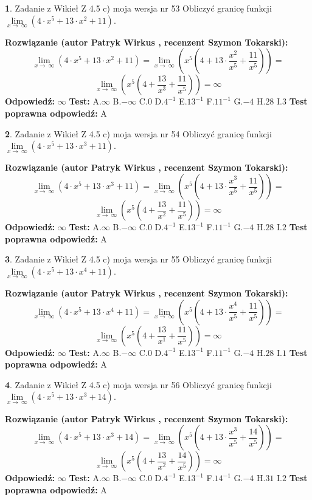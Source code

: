 \documentclass[12pt, a4paper]{article}
\theoremstyle{definition} %
\newtheorem{zad}{}
\newcommand{\zadStart}[1]{\begin{zad}#1\newline}
\newcommand{\zadStop}{\end{zad}}
\newcommand{\rozwStart}[2]{\noindent \textbf{Rozwiązanie (autor #1 , recenzent #2): }\newline}
\newcommand{\rozwStop}{\newline}
\newcommand{\odpStart}{\noindent \textbf{Odpowiedź:}\newline}
\newcommand{\odpStop}{\newline}
\newcommand{\testStart}{\noindent \textbf{Test:}\newline}
\newcommand{\testStop}{\newline}
\newcommand{\kluczStart}{\noindent \textbf{Test poprawna odpowiedź:}\newline}
\newcommand{\kluczStop}{\newline}
\begin{document}
\zadStart{Zadanie z Wikieł Z 4.5 c) moja wersja nr 53}
Obliczyć granicę funkcji  $\lim\limits_{x\to\ \infty}(4 \cdot x^{5}+13 \cdot x^{2}+11)$.
\zadStop
\rozwStart{Patryk Wirkus}{Szymon Tokarski}
$$\lim\limits_{x\to\ \infty}(4 \cdot x^{5}+13 \cdot x^{2}+11) = \lim\limits_{x\to\ \infty}(x^{5}(4 +13 \cdot \frac{x^{2}}{x^{5}}+\frac{11}{x^{5}})) =$$ $$\lim\limits_{x\to\ \infty}(x^{5}(4 +\frac{13}{x^{3}}+\frac{11}{x^{5}})) =\infty$$
\rozwStop
\odpStart
$\infty$
\odpStop
\testStart
A.$\infty$ B.$-\infty$ C.$0$ D.$4^{-1}$ E.$13^{-1}$
F.$11^{-1}$ G.$-4$
H.$28$
I.$3$
\testStop
\kluczStart
A
\kluczStop



\zadStart{Zadanie z Wikieł Z 4.5 c) moja wersja nr 54}
Obliczyć granicę funkcji  $\lim\limits_{x\to\ \infty}(4 \cdot x^{5}+13 \cdot x^{3}+11)$.
\zadStop
\rozwStart{Patryk Wirkus}{Szymon Tokarski}
$$\lim\limits_{x\to\ \infty}(4 \cdot x^{5}+13 \cdot x^{3}+11) = \lim\limits_{x\to\ \infty}(x^{5}(4 +13 \cdot \frac{x^{3}}{x^{5}}+\frac{11}{x^{5}})) =$$ $$\lim\limits_{x\to\ \infty}(x^{5}(4 +\frac{13}{x^{2}}+\frac{11}{x^{5}})) =\infty$$
\rozwStop
\odpStart
$\infty$
\odpStop
\testStart
A.$\infty$ B.$-\infty$ C.$0$ D.$4^{-1}$ E.$13^{-1}$
F.$11^{-1}$ G.$-4$
H.$28$
I.$2$
\testStop
\kluczStart
A
\kluczStop



\zadStart{Zadanie z Wikieł Z 4.5 c) moja wersja nr 55}
Obliczyć granicę funkcji  $\lim\limits_{x\to\ \infty}(4 \cdot x^{5}+13 \cdot x^{4}+11)$.
\zadStop
\rozwStart{Patryk Wirkus}{Szymon Tokarski}
$$\lim\limits_{x\to\ \infty}(4 \cdot x^{5}+13 \cdot x^{4}+11) = \lim\limits_{x\to\ \infty}(x^{5}(4 +13 \cdot \frac{x^{4}}{x^{5}}+\frac{11}{x^{5}})) =$$ $$\lim\limits_{x\to\ \infty}(x^{5}(4 +\frac{13}{x^{1}}+\frac{11}{x^{5}})) =\infty$$
\rozwStop
\odpStart
$\infty$
\odpStop
\testStart
A.$\infty$ B.$-\infty$ C.$0$ D.$4^{-1}$ E.$13^{-1}$
F.$11^{-1}$ G.$-4$
H.$28$
I.$1$
\testStop
\kluczStart
A
\kluczStop



\zadStart{Zadanie z Wikieł Z 4.5 c) moja wersja nr 56}
Obliczyć granicę funkcji  $\lim\limits_{x\to\ \infty}(4 \cdot x^{5}+13 \cdot x^{3}+14)$.
\zadStop
\rozwStart{Patryk Wirkus}{Szymon Tokarski}
$$\lim\limits_{x\to\ \infty}(4 \cdot x^{5}+13 \cdot x^{3}+14) = \lim\limits_{x\to\ \infty}(x^{5}(4 +13 \cdot \frac{x^{3}}{x^{5}}+\frac{14}{x^{5}})) =$$ $$\lim\limits_{x\to\ \infty}(x^{5}(4 +\frac{13}{x^{2}}+\frac{14}{x^{5}})) =\infty$$
\rozwStop
\odpStart
$\infty$
\odpStop
\testStart
A.$\infty$ B.$-\infty$ C.$0$ D.$4^{-1}$ E.$13^{-1}$
F.$14^{-1}$ G.$-4$
H.$31$
I.$2$
\testStop
\kluczStart
A
\kluczStop
\end{document}
